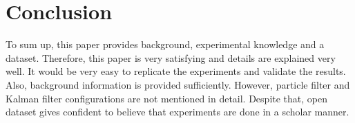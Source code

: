 \documentclass[12pt, letterpaper]{article}
\begin{document}
\section{Conclusion}
	To sum up, this paper provides background, experimental knowledge and a dataset. Therefore, this paper is very satisfying and details are explained very well. It would be very easy to replicate the experiments and validate the results. Also, background information is provided sufficiently. However, particle filter and Kalman filter configurations are not mentioned in detail. Despite that, open dataset gives confident to believe that experiments are done in a scholar manner.
\end{document}
